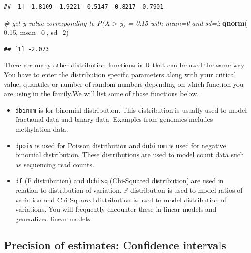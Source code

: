 \documentclass[12pt,]{krantz}
\newenvironment{Shaded}{\begin{snugshade}}{\end{snugshade}}
\newcommand{\CommentTok}[1]{\textcolor[rgb]{0.56,0.35,0.01}{\textit{#1}}}
\newcommand{\DataTypeTok}[1]{\textcolor[rgb]{0.13,0.29,0.53}{#1}}
\newcommand{\DecValTok}[1]{\textcolor[rgb]{0.00,0.00,0.81}{#1}}
\newcommand{\FloatTok}[1]{\textcolor[rgb]{0.00,0.00,0.81}{#1}}
\newcommand{\KeywordTok}[1]{\textcolor[rgb]{0.13,0.29,0.53}{\textbf{#1}}}
\newcommand{\NormalTok}[1]{#1}
\theoremstyle{definition}
\theoremstyle{definition}
\theoremstyle{definition}
\theoremstyle{remark}
\begin{document}
\begin{verbatim}
## [1] -1.8109 -1.9221 -0.5147  0.8217 -0.7901
\end{verbatim}

\begin{Shaded}
\begin{Highlighting}[]
\CommentTok{# get y value corresponding to P(X > y) = 0.15 with  mean=0 and sd=2}
\KeywordTok{qnorm}\NormalTok{( }\FloatTok{0.15}\NormalTok{, }\DataTypeTok{mean=}\DecValTok{0}\NormalTok{ , }\DataTypeTok{sd=}\DecValTok{2}\NormalTok{)}
\end{Highlighting}
\end{Shaded}

\begin{verbatim}
## [1] -2.073
\end{verbatim}

There are many other distribution functions in R that can be used the
same way. You have to enter the distribution specific parameters along
with your critical value, quantiles or number of random numbers
depending on which function you are using in the family.We will list
some of those functions below.

\begin{itemize}
\item
  \texttt{dbinom} is for binomial distribution. This distribution is
  usually used to model fractional data and binary data. Examples from
  genomics includes methylation data.
\item
  \texttt{dpois} is used for Poisson distribution and \texttt{dnbinom}
  is used for negative binomial distribution. These distributions are
  used to model count data such as sequencing read counts.
\item
  \texttt{df} (F distribution) and \texttt{dchisq} (Chi-Squared
  distribution) are used in relation to distribution of variation. F
  distribution is used to model ratios of variation and Chi-Squared
  distribution is used to model distribution of variations. You will
  frequently encounter these in linear models and generalized linear
  models.
\end{itemize}

\hypertarget{precision-of-estimates-confidence-intervals}{%
\subsection{Precision of estimates: Confidence
intervals}\label{precision-of-estimates-confidence-intervals}}
\end{document}
